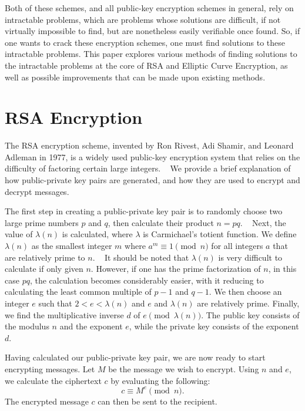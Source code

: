 \documentclass[letterpaper,twocolumn,12pt]{article}
\begin{document}
    Both of these schemes, and all public-key encryption schemes in general,
    rely on intractable problems, which are problems whose solutions are
    difficult, if not virtually impossible to find, but are nonetheless easily
    verifiable once found.
    So, if one wants to crack these encryption schemes, one must find solutions
    to these intractable problems.
    This paper explores various methods of finding solutions to the intractable
    problems at the core of RSA and Elliptic Curve Encryption, as well as
    possible improvements that can be made upon existing methods.

    \section*{RSA Encryption}

    The RSA encryption scheme, invented by Ron Rivest, Adi Shamir, and Leonard
    Adleman in 1977, is a widely used public-key encryption system that relies
    on the difficulty of factoring certain large integers.
    ~\cite{RSARivest}
    We provide a brief
    explanation of how public-private key pairs are generated, and how they
    are used to encrypt and decrypt messages.
    
    The first step in creating a public-private key pair is to randomly choose
    two large prime numbers \( p \) and \( q \), then calculate their product
    \( n = pq \).
    ~\cite{RSARivest}
    Next, the value of \( \lambda(n) \) is calculated, where
    \( \lambda \) is Carmichael's totient function.
    We define \( \lambda(n) \) as the smallest integer \( m \) where
    \( a^m \equiv 1 \pmod{n} \) for all integers \( a \) that are relatively
    prime to \( n \).
    ~\cite{WA:Carmichael}
    It should be noted that \( \lambda(n) \) is very difficult to calculate if
    only given \( n \).
    However, if one has the prime factorization of \( n \), in this case
    \( pq \), the calculation becomes considerably easier, with it reducing
    to calculating the least common multiple of \( p - 1 \) and \( q - 1\).
    We then choose an integer \( e \) such that \( 2 < e < \lambda(n) \) and
    \( e \) and \( \lambda(n) \) are relatively prime.
    Finally, we find the
    multiplicative inverse \( d \) of \( e \pmod{\lambda(n)} \).
    The public key consists of the modulus \( n \) and the exponent \( e \),
    while the private key consists of the exponent \( d \).

    Having calculated our public-private key pair, we are now ready to start
    encrypting messages.
    Let \( M \) be the message we wish to encrypt.
    Using \( n \) and \( e \), we calculate the ciphertext \( c \) by
    evaluating the following:
    \[ c \equiv M^e \pmod{n}. \]
    The encrypted message \( c \) can then be sent to the recipient.
\end{document}
